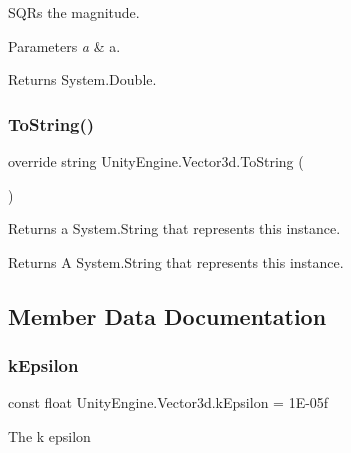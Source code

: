 S\+Q\+Rs the magnitude. 


\begin{DoxyParams}{Parameters}
{\em a} & a.\\
\hline
\end{DoxyParams}
\begin{DoxyReturn}{Returns}
System.\+Double.
\end{DoxyReturn}
\mbox{\label{struct_unity_engine_1_1_vector3d_a92880ca24fc30ca5fbfc04a93a99d837}} 
\subsubsection{\texorpdfstring{To\+String()}{ToString()}}
{\footnotesize\ttfamily override string Unity\+Engine.\+Vector3d.\+To\+String (\begin{DoxyParamCaption}{ }\end{DoxyParamCaption})\hspace{0.3cm}{\ttfamily [inline]}}



Returns a System.\+String that represents this instance. 

\begin{DoxyReturn}{Returns}
A System.\+String that represents this instance.
\end{DoxyReturn}


\subsection{Member Data Documentation}
\mbox{\label{struct_unity_engine_1_1_vector3d_a54828fa07f859126d76b230644d59664}} 
\subsubsection{\texorpdfstring{k\+Epsilon}{kEpsilon}}
{\footnotesize\ttfamily const float Unity\+Engine.\+Vector3d.\+k\+Epsilon = 1\+E-\/05f}



The k epsilon 

